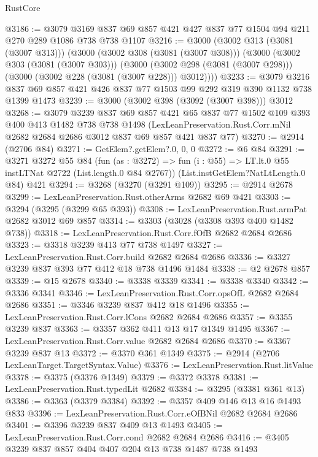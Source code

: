 \begin{lexlean}{RustCore}
\begin{coremodule}
@3186 := @3079 @3169 @837 @69 @857 @421 @427 @837 @77 @1504 @94 @211 @270 @289 @1086 @738 @738 @1107
@3216 := @3000
    (@3002 @313 (@3081 (@3007 @313)))
    (@3000
      (@3002 @308 (@3081 (@3007 @308)))
      (@3000
        (@3002 @303 (@3081 (@3007 @303)))
        (@3000 (@3002 @298 (@3081 (@3007 @298))) (@3000 (@3002 @228 (@3081 (@3007 @228))) @3012))))
@3233 := @3079
    @3216
    @837
    @69
    @857
    @421
    @426
    @837
    @77
    @1503
    @99
    @292
    @319
    @390
    @1132
    @738
    @1399
    @1473
@3239 := @3000 (@3002 @398 (@3092 (@3007 @398))) @3012
@3268 := @3079
    @3239
    @837
    @69
    @857
    @421
    @65
    @837
    @77
    @1502
    @109
    @393
    @400
    @413
    @1482
    @738
    @738
    @1498
    (LexLeanPreservation.Rust.Corr.mNil @2682 @2684 @2686 @3012 @837 @69 @857 @421 @837 @77)
@3270 := @2914 (@2706 @84)
@3271 := GetElem?.getElem?.{0, 0, 0}
@3272 := @6 @84
@3291 := @3271
    @3272
    @55
    @84
    (fun (as : @3272) => fun (i : @55) => LT.lt.{0} @55 instLTNat @2722 (List.length.{0} @84 @2767))
    (List.instGetElem?NatLtLength.{0} @84)
    @421
@3294 := @3268 (@3270 (@3291 @109))
@3295 := @2914 @2678
@3299 := LexLeanPreservation.Rust.otherArms @2682 @69 @421
@3303 := @3294 (@3295 (@3299 @65 @393))
@3308 := LexLeanPreservation.Rust.armPat @2682 @3012 @69 @857
@3314 := @3303 (@3028 (@3308 @393 @400 @1482 @738))
@3318 := LexLeanPreservation.Rust.Corr.fOfB @2682 @2684 @2686
@3323 := @3318 @3239 @413 @77 @738 @1497
@3327 := LexLeanPreservation.Rust.Corr.build @2682 @2684 @2686
@3336 := @3327 @3239 @837 @393 @77 @412 @18 @738 @1496 @1484
@3338 := @2 @2678 @857
@3339 := @15 @2678
@3340 := @3338 @3339
@3341 := @3338 @3340
@3342 := @3336 @3341
@3346 := LexLeanPreservation.Rust.Corr.opsOfL @2682 @2684 @2686
@3351 := @3346 @3239 @837 @412 @18 @1496
@3355 := LexLeanPreservation.Rust.Corr.lCons @2682 @2684 @2686
@3357 := @3355 @3239 @837
@3363 := @3357 @362 @411 @13 @17 @1349 @1495
@3367 := LexLeanPreservation.Rust.Corr.value @2682 @2684 @2686
@3370 := @3367 @3239 @837 @13
@3372 := @3370 @361 @1349
@3375 := @2914 (@2706 LexLeanTarget.TargetSyntax.Value)
@3376 := LexLeanPreservation.Rust.litValue
@3378 := @3375 (@3376 @1349)
@3379 := @3372 @3378
@3381 := LexLeanPreservation.Rust.typedLit @2682
@3384 := @3295 (@3381 @361 @13)
@3386 := @3363 (@3379 @3384)
@3392 := @3357 @409 @146 @13 @16 @1493 @833
@3396 := LexLeanPreservation.Rust.Corr.eOfBNil @2682 @2684 @2686
@3401 := @3396 @3239 @837 @409 @13 @1493
@3405 := LexLeanPreservation.Rust.Corr.cond @2682 @2684 @2686
@3416 := @3405 @3239 @837 @857 @404 @407 @204 @13 @738 @1487 @738 @1493

\end{coremodule}
\end{lexlean}
